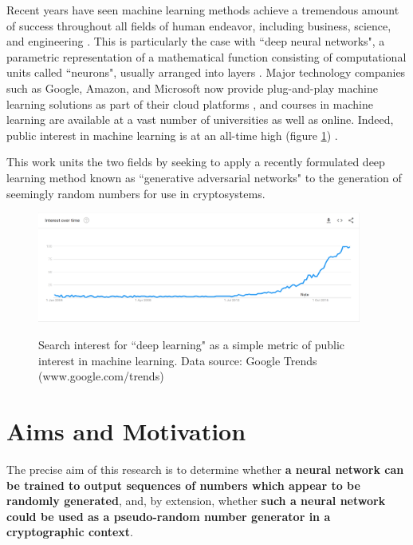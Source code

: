 \documentclass[12pt, titlepage]{report}
\theoremstyle{definition}
\begin{document}
Recent years have seen machine learning methods achieve a tremendous amount of success throughout all fields of human endeavor, including business, science, and engineering \cite[p. 24-29]{russel2009artificial}. This is particularly the case with ``deep neural networks", a parametric representation of a mathematical function consisting of computational units called ``neurons", usually arranged into layers \cite[p. 731-732]{russel2009artificial}. Major technology companies such as Google, Amazon, and Microsoft now provide plug-and-play machine learning solutions as part of their cloud platforms \cite{google2018automl} \cite{amazon2018aws} \cite{microsoft2018azure}, and courses in machine learning are available at a vast number of universities as well as online. Indeed, public interest in machine learning is at an all-time high (figure \ref{figure:googletrends_dl}) \cite{forbes2016short}.

This work units the two fields by seeking to apply a recently formulated deep learning method known as ``generative adversarial networks" to the generation of seemingly random numbers for use in cryptosystems.


\begin{figure}
\centering
\includegraphics[width=0.95\textwidth]{img/google_trends_dl.png}\\
\caption{Search interest for ``deep learning" as a simple metric of public interest in machine learning. Data source: Google Trends (www.google.com/trends) \cite{google2018trends}}
\label{figure:googletrends_dl}
\end{figure}


\section{Aims and Motivation}\label{subsection:aims}
The precise aim of this research is to determine whether \textbf{a neural network can be trained to output sequences of numbers which appear to be randomly generated}, and, by extension, whether \textbf{such a neural network could be used as a pseudo-random number generator in a cryptographic context}. 
\end{document}
